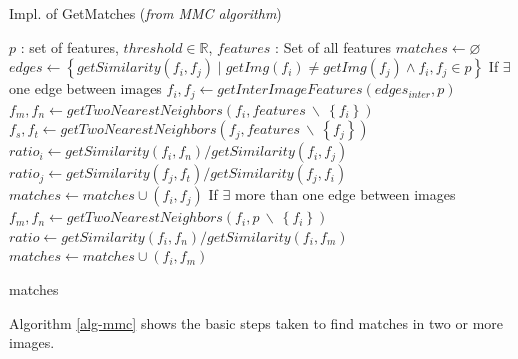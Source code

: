 \documentclass{article}
\begin{document}
\begin{algorithm}
\caption{Impl. of GetMatches (\emph{from MMC algorithm})}
\label{alg-getmatches}
\begin{algorithmic}
\Require $p$ : set of features, $threshold \in \mathbb{R}$, $features$ : 
Set of all features
\State $matches \gets \varnothing$
\State $edges \gets \left\{getSimilarity(f_i, f_j) \mid getImg(f_i) \neq 
getImg(f_j) \wedge f_i, f_j \in p \right\}$
 \Comment If $\exists$ one edge 
between images
	\State $f_i,f_j \gets getInterImageFeatures(edges_{inter}, p)$
	\State $f_m,f_n \gets getTwoNearestNeighbors(f_i, features ~ 
\backslash ~ \left\{f_i\right\})$
	\State $f_s,f_t \gets getTwoNearestNeighbors(f_j, features ~ 
\backslash ~ \left\{f_j\right\})$
	\State $ratio_i \gets getSimilarity(f_i, f_n) / getSimilarity(f_i, 
f_j)$
	\State $ratio_j \gets getSimilarity(f_j, f_t) / getSimilarity(f_j, 
f_i)$
		\State $matches \gets matches \cup (f_i, f_j)$
	\EndIf
{} \Comment If $\exists$ more 
than one edge between images
		\State $f_m,f_n \gets getTwoNearestNeighbors(f_i, p ~ \backslash 
~ \left\{f_i\right\})$
		\State $ratio \gets getSimilarity(f_i, f_n) / getSimilarity(f_i, 
f_m)$
			\State $matches \gets matches \cup (f_i, f_m)$
		\EndIf
	\EndFor
\EndIf

\Return matches
\end{algorithmic}
\end{algorithm}

Algorithm \ref{alg-mmc} shows the basic steps taken to find matches in 
two or more images. 
\end{document}
